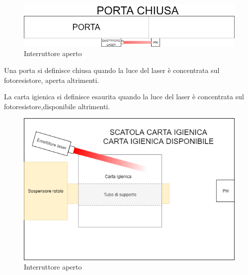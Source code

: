 \documentclass[12pt]{article}
\begin{document}
\begin{figure}[h!]
\centering
	\includegraphics[scale=0.45]{img/parteLocale/PortaChiusa.png} 
    \caption{Interruttore aperto}
\end{figure}
Una porta si definisce chiusa quando la luce del laser è concentrata sul fotoresistore, aperta altrimenti.


\newpage
La carta igienica si definisce esaurita quando la luce del laser è concentrata sul fotoresistore,disponibile altrimenti.
\begin{figure}[h!]
\centering
	\includegraphics[scale=0.55]{img/parteLocale/CartaIgienicaDisponibile.png}  
    \caption{Interruttore aperto}
\end{figure}
\end{document}
